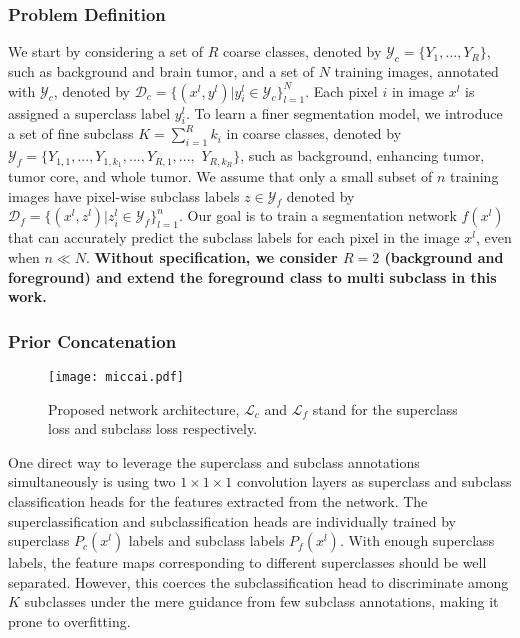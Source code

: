 \documentclass[runningheads]{llncs}
\begin{document}
\subsubsection{Problem Definition}
We start by considering a set of $R$ coarse classes, denoted by $\mathcal{Y}_{c}=\{Y_1,...,Y_R\}$, such as background and brain tumor, and a set of $N$ training images, annotated with $\mathcal{Y}_{c}$, denoted by $\mathcal{D}_{c}=\{(x^l,y^l)|y^l_i\in\mathcal{Y}_{c}\}_{l=1}^N$. Each pixel $i$ in image $x^l$ is assigned a superclass label $y^l_i$. To learn a finer segmentation model, we introduce a set of fine subclass $K=\sum_{i=1}^R{k_i}$ in coarse classes, denoted by $\mathcal{Y}_{f}=\{Y_{1,1},...,Y_{1,k_1},...,Y_{R,1},...,$ $Y_{R,k_R}\}$, such as background, enhancing tumor, tumor core, and whole tumor. We assume that only a small subset of $n$ training images have pixel-wise subclass labels $z\in\mathcal{Y}_f$ denoted by $\mathcal{D}_{f}=\{(x^l,z^l)|z_i^l\in\mathcal{Y}_{f}\}_{l=1}^n$. Our goal is to train a segmentation network $f(x^l)$ that can accurately predict the subclass labels for each pixel in the image $x^l$, even when $n\ll N$. \textbf{Without specification, we consider $R=2$ (background and foreground) and extend the foreground class to multi subclass in this work.}

\subsubsection{Prior Concatenation}
\begin{figure}[tbp!]
\centering
\texttt{[image: miccai.pdf]}
\caption{Proposed network architecture, $\mathcal{L}_c$ and $\mathcal{L}_f$ stand for the superclass loss and subclass loss respectively.}
\label{fig:Network}
\end{figure}

One direct way to leverage the superclass and subclass annotations simultaneously is using two $1\times1\times1$ convolution layers as superclass and subclass classification heads for the features extracted from the network. The superclassification and subclassification heads are individually trained by superclass $P_c(x^l)$ labels and subclass labels $P_f(x^l)$. With enough superclass labels, the feature maps corresponding to different superclasses should be well separated. 
However, this coerces the subclassification head to discriminate among $K$ subclasses under the mere guidance from few subclass annotations, making it prone to overfitting.
\end{document}
